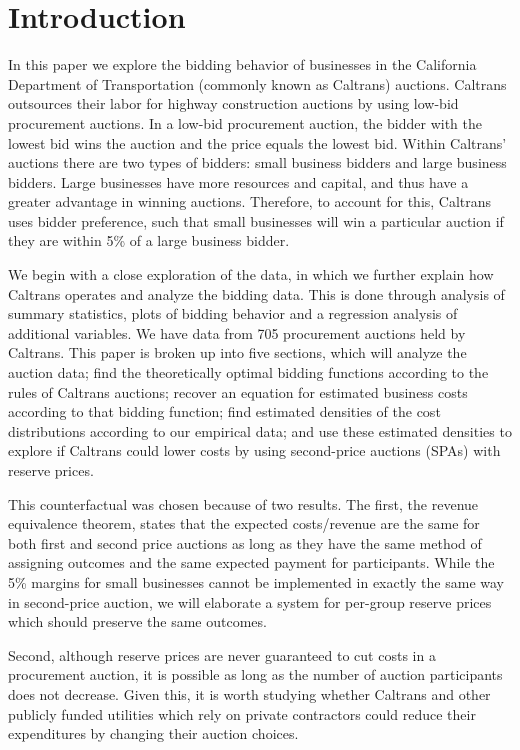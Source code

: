 \section{Introduction}

In this paper we explore the bidding behavior of businesses in the California Department of Transportation (commonly known as Caltrans) auctions.
Caltrans outsources their labor for highway construction auctions by using low-bid procurement auctions.
In a low-bid procurement auction, the bidder with the lowest bid wins the auction and the price equals the lowest bid.
Within Caltrans' auctions there are two types of bidders: small business bidders and large business bidders.
Large businesses have more resources and capital, and thus have a greater advantage in winning auctions.
Therefore, to account for this, Caltrans uses bidder preference, such that small businesses will win a particular auction if they are within 5\% of a large business bidder.

We begin with a close exploration of the data, in which we further explain how Caltrans operates and analyze the
bidding data. This is done through analysis of summary statistics, plots of bidding behavior and a regression analysis of additional variables.
We have data from 705 procurement auctions held by Caltrans. This paper is broken up into
five sections, which will analyze the auction data; find the theoretically optimal
bidding functions according to the rules of Caltrans auctions; recover
an equation for estimated business costs according to that bidding function;
find estimated densities of the cost distributions according to our empirical data;
and use these estimated densities to explore if Caltrans could lower costs by
using second-price auctions (SPAs) with reserve prices.

This counterfactual was chosen because of two results. The first, the revenue
equivalence theorem, states that the expected costs/revenue are the same
for both first and second price auctions as long as they have the same method
of assigning outcomes and the same expected payment for participants.
While the 5\% margins for small businesses cannot be implemented in exactly
the same way in second-price auction, we will elaborate a system for
per-group reserve prices which should preserve the same outcomes.

Second, although reserve prices are never guaranteed to cut costs in a
procurement auction, it is possible as long as the number of auction
participants does not decrease.
Given this, it is worth studying whether Caltrans and other publicly funded
utilities which rely on private contractors could reduce their
expenditures by changing their auction choices.

